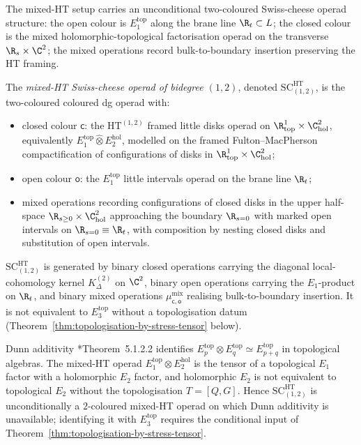 The mixed-HT setup carries an unconditional two-coloured
Swiss-cheese operad structure: the open colour is \(E_1^{\mathrm{top}}\)
along the brane line \(\R_t\subset L\); the closed colour is the
mixed holomorphic-topological factorisation operad on the transverse
\(\R_s\times\C^2\); the mixed operations record bulk-to-boundary
insertion preserving the HT framing.

\begin{defn}
\label{defn:sc-ht-operad}
The \emph{mixed-HT Swiss-cheese operad of bidegree \((1,2)\)},
denoted \(\mathrm{SC}^{\mathrm{HT}}_{(1,2)}\), is the two-coloured
coloured dg operad with:
\begin{itemize}
  \item closed colour \(\mathsf c\): the \(\mathrm{HT}^{(1,2)}\)
        framed little disks operad on \(\R^1_{\mathrm{top}}\times\C^2_{\mathrm{hol}}\),
        equivalently \(E_1^{\mathrm{top}}\widehat\otimes E_2^{\mathrm{hol}}\),
        modelled on the framed Fulton--MacPherson compactification of
        configurations of disks in
        \(\R^1_{\mathrm{top}}\times\C^2_{\mathrm{hol}}\);
  \item open colour \(\mathsf o\): the \(E_1^{\mathrm{top}}\) little
        intervals operad on the brane line \(\R_t\);
  \item mixed operations recording configurations of closed disks in
        the upper half-space \(\R_{s\ge 0}\times\C^2_{\mathrm{hol}}\)
        approaching the boundary \(\R_{s=0}\) with marked open
        intervals on \(\R_{s=0}\equiv\R_t\), with composition by
        nesting closed disks and substitution of open intervals.
\end{itemize}
\(\mathrm{SC}^{\mathrm{HT}}_{(1,2)}\) is generated by binary closed
operations carrying the diagonal local-cohomology kernel
\(K^{(2)}_\Delta\) on \(\C^2\), binary open operations carrying the
\(E_1\)-product on \(\R_t\), and binary mixed operations
\(\mu^{\mathrm{mix}}_{\mathsf c,\mathsf o}\) realising bulk-to-boundary
insertion.  It is not equivalent to \(E_3^{\mathrm{top}}\) without a
topologisation datum (Theorem~\ref{thm:topologisation-by-stress-tensor}
below).
\end{defn}

\begin{rmk}\label{rmk:no-dunn-collapse}
Dunn additivity \cite{lurie-ha}*{Theorem~5.1.2.2} identifies
\(E_p^{\mathrm{top}}\otimes E_q^{\mathrm{top}}\simeq E_{p+q}^{\mathrm{top}}\)
in topological algebras.  The mixed-HT operad
\(E_1^{\mathrm{top}}\otimes E_2^{\mathrm{hol}}\) is the tensor of a
topological \(E_1\) factor with a holomorphic \(E_2\) factor, and
holomorphic \(E_2\) is not equivalent to topological \(E_2\) without
the topologisation \(T=[Q,G]\).  Hence
\(\mathrm{SC}^{\mathrm{HT}}_{(1,2)}\) is unconditionally a
\(2\)-coloured mixed-HT operad on which Dunn additivity is unavailable;
identifying it with \(E_3^{\mathrm{top}}\) requires the conditional
input of Theorem~\ref{thm:topologisation-by-stress-tensor}.
\end{rmk}

